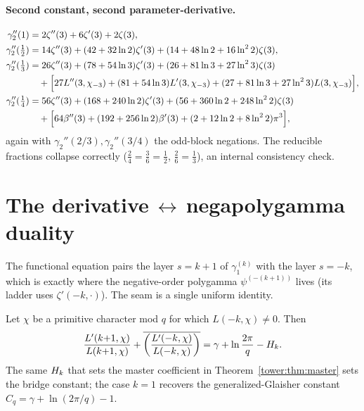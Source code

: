 \paragraph{Second constant, second parameter-derivative.}
\begin{align*}
\gamma_2''(1)   &= 2\zeta''(3)+6\zeta'(3)+2\zeta(3),\\
\gamma_2''(\tfrac12) &= 14\zeta''(3)+(42+32\ln2)\zeta'(3)+(14+48\ln2+16\ln^2 2)\zeta(3),\\
\gamma_2''(\tfrac13) &= 26\zeta''(3)+(78+54\ln3)\zeta'(3)+(26+81\ln3+27\ln^2 3)\zeta(3)\\
 &\quad +\Bigl[27L''(3,\chi_{-3})+(81+54\ln3)L'(3,\chi_{-3})+(27+81\ln3+27\ln^2 3)L(3,\chi_{-3})\Bigr],\\
\gamma_2''(\tfrac14) &= 56\zeta''(3)+(168+240\ln2)\zeta'(3)+(56+360\ln2+248\ln^2 2)\zeta(3)\\
 &\quad +\Bigl[64\beta''(3)+(192+256\ln2)\beta'(3)+(2+12\ln2+8\ln^2 2)\pi^3\Bigr],
\end{align*}
again with $\gamma_2''(2/3),\gamma_2''(3/4)$ the odd-block negations. The
reducible fractions collapse correctly ($\tfrac24=\tfrac36=\tfrac12$,
$\tfrac26=\tfrac13$), an internal consistency check.

\section{The derivative\,$\leftrightarrow$\,negapolygamma duality}\label{tower:sec:duality}

The functional equation pairs the layer $s=k+1$ of $\gamma_1^{(k)}$ with the
layer $s=-k$, which is exactly where the negative-order polygamma
$\psi^{(-(k+1))}$ lives (its ladder uses $\zeta'(-k,\cdot)$). The seam is a
single uniform identity.

\begin{theorem}\label{tower:thm:bridge}
Let $\chi$ be a primitive character mod $q$ for which $L(-k,\chi)\neq0$. Then
\begin{equation}\label{tower:eq:bridge}
  \frac{L'(k{+}1,\chi)}{L(k{+}1,\chi)}
   +\overline{\left(\frac{L'(-k,\chi)}{L(-k,\chi)}\right)}
   =\gamma+\ln\frac{2\pi}{q}-H_{k}.
\end{equation}
The same $H_{k}$ that sets the master coefficient in
Theorem~\ref{tower:thm:master} sets the bridge constant; the case $k=1$ recovers the
generalized-Glaisher constant $C_q=\gamma+\ln(2\pi/q)-1$.
\end{theorem}


